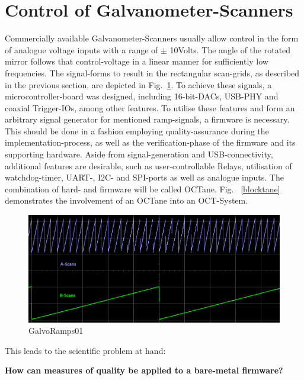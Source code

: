 \section{Control of Galvanometer-Scanners}
Commercially available Galvanometer-Scanners usually allow control in the form of analogue voltage inputs with a range of $\pm$ 10Volts. The angle of the rotated mirror follows that control-voltage in a linear manner for sufficiently low frequencies. The signal-forms to result in the rectangular scan-grids, as described in the previous section, are depicted in Fig.~\ref{GalvoRamps01}. To achieve these signals, a microcontroller-board was designed, including 16-bit-DACs, USB-PHY and coaxial Trigger-IOs, among other features. To utilise these features and form an arbitrary signal generator for mentioned ramp-signals, a firmware is necessary. This should be done in a fashion employing quality-assurance during the implementation-process, as well as the verification-phase of the firmware and its supporting hardware. Aside from signal-generation and USB-connectivity, additional features are desirable, such as user-controllable Relays, utilisation of watchdog-timer, UART-, I2C- and SPI-ports as well as analogue inputs. The combination of hard- and firmware will be called OCTane. Fig. ~\ref{blocktane} demonstrates the involvement of an OCTane into an OCT-System.

\begin{figure}[h!]	\centering	\includegraphics[width=\textwidth]{images/GalvoRamps01.png}	\caption{GalvoRamps01}	\label{GalvoRamps01}	\end{figure}
This leads to the scientific problem at hand: 
\begin{center} {\bf How can measures of quality be applied to a bare-metal firmware?}
\end{center}
